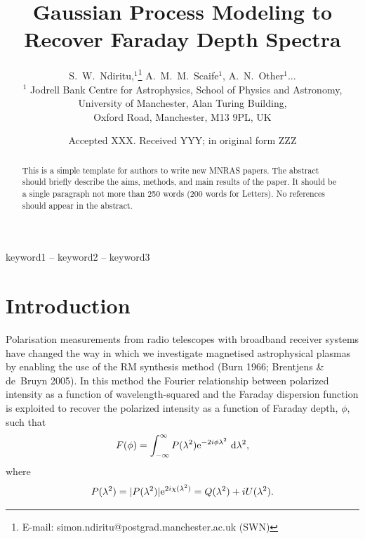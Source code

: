 \documentclass[fleqn,usenatbib]{mnras}
\title[GPM for Faraday Depth Spectra]{Gaussian Process Modeling to Recover Faraday Depth Spectra}
\author[S.~W.~Ndiritu et al.]{
S.~W.~Ndiritu,$^{1}$\thanks{E-mail: simon.ndiritu@postgrad.manchester.ac.uk
 (SWN)}
A.~M.~M.~Scaife$^{1}$,
A.~N.~Other$^{1}$...
\\
$^{1}$ Jodrell Bank Centre for Astrophysics, School of Physics and Astronomy, University of Manchester, Alan Turing Building,\\ Oxford Road, Manchester, M13 9PL, UK
}
\date{Accepted XXX. Received YYY; in original form ZZZ}
\begin{document}
\label{firstpage}
\pagerange{\pageref{firstpage}--\pageref{lastpage}}
\maketitle

\begin{abstract}
This is a simple template for authors to write new MNRAS papers.
The abstract should briefly describe the aims, methods, and main results of the paper.
It should be a single paragraph not more than 250 words (200 words for Letters).
No references should appear in the abstract.
\end{abstract}

\begin{keywords}
keyword1 -- keyword2 -- keyword3
\end{keywords}



\section{Introduction}

Polarisation measurements from radio telescopes with broadband receiver systems have changed the way in which we investigate magnetised astrophysical plasmas by enabling the use of the RM synthesis method (Burn 1966; Brentjens \& de~Bruyn 2005). In this method the Fourier relationship between polarized intensity as a function of wavelength-squared and the Faraday dispersion function is exploited to recover the polarized intensity as a function of Faraday depth, $\phi$, such that
%
\begin{equation}
\label{eq:fourier}
F(\phi) = \int_{-\infty}^{\infty}{ P(\lambda^2){\rm e}^{-2i\phi \lambda^2}~{\rm d}\lambda^2 },
\end{equation}
%
where 
%
\begin{equation}
P(\lambda^2) = |P(\lambda^2)|{\rm e}^{2i\chi(\lambda^2)} = Q(\lambda^2) + iU(\lambda^2).
\end{equation}
\end{document}

